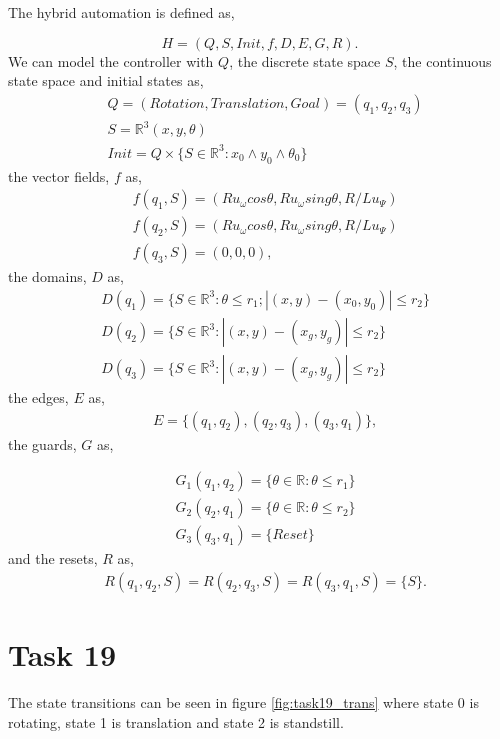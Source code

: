 \documentclass[a4paper,12pt,oneside,onecolumn]{article} %
\begin{document}
The hybrid automation is defined as,

\begin{equation}
    H = (Q,S,Init,f,D,E,G,R).
\end{equation}
We can model the controller with $Q$, the discrete state space $S$,
the continuous state space and initial states as,
\begin{align*}
    &Q=(Rotation,Translation,Goal)=(q_1,q_2,q_3) \\
    &S=\mathbb{R}^3 (x,y,\theta)\\
    &Init = Q \times \{ S \in \mathbb{R}^3 :x_0\wedge y_0 \wedge
    \theta_0\}
\end{align*} 
the vector fields, $f$ as,
\begin{align*}
    &f(q_1,S)=(Ru_{\omega}cos\theta,Ru_{\omega}sing\theta,R/Lu_{\Psi}) \\
    &f(q_2,S)=(Ru_{\omega}cos\theta,Ru_{\omega}sing\theta,R/Lu_{\Psi})\\
    &f(q_3,S)=(0,0,0),
\end{align*}
the domains, $D$ as,
\begin{align*}
    &D(q_1)=\{S\in \mathbb{R}^3:\theta \le r_1; |(x,y)-(x_0,y_0)|\le r_2\} \\
    &D(q_2)=\{S\in \mathbb{R}^3:|(x,y)-(x_g,y_g)| \le r_2\} \\
    &D(q_3)=\{S\in \mathbb{R}^3:|(x,y)-(x_g,y_g)| \le r_2\}
\end{align*}
the edges, $E$ as,
\begin{align*}
    &E = \{(q_1,q_2), (q_2,q_3), (q_3, q_1)\},
\end{align*}
the guards, $G$ as,

\begin{align*}
    &G_1(q_1,q_2)=\{\theta\in\mathbb{R}:\theta\le r_1\} \\
    &G_2(q_2,q_1)=\{\theta\in\mathbb{R}:\theta\le r_2\} \\
    &G_3(q_3,q_1)=\{Reset\}
\end{align*}
and the resets, $R$ as,
\begin{align*}
  &R(q_1,q_2,S)=R(q_2,q_3,S)=R(q_3,q_1,S)=\{S\}.
\end{align*}


\section*{Task 19}
  The state transitions can be seen in figure \ref{fig:task19_trans}
  where state 0 is rotating, state 1 is translation and state 2 is
  standstill. 
\end{document}
